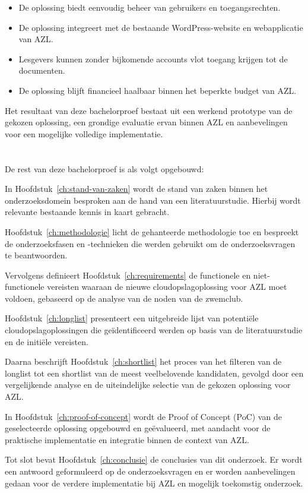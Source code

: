 \begin{itemize}
  \item De oplossing biedt eenvoudig beheer van gebruikers en toegangsrechten.
  \item De oplossing integreert met de bestaande WordPress-website en webapplicatie van AZL.
  \item Lesgevers kunnen zonder bijkomende accounts vlot toegang krijgen tot de documenten.
  \item De oplossing blijft financieel haalbaar binnen het beperkte budget van AZL.
\end{itemize}

Het resultaat van deze bachelorproef bestaat uit een werkend prototype van de gekozen oplossing, een grondige evaluatie ervan binnen AZL en aanbevelingen voor een mogelijke volledige implementatie.

\section{}%
\label{sec:opzet-bachelorproef}


De rest van deze bachelorproef is als volgt opgebouwd:

In Hoofdstuk~\ref{ch:stand-van-zaken} wordt de stand van zaken binnen het onderzoeksdomein besproken aan de hand van een literatuurstudie. Hierbij wordt relevante bestaande kennis in kaart gebracht.

Hoofdstuk~\ref{ch:methodologie} licht de gehanteerde methodologie toe en bespreekt de onderzoeksfasen en -technieken die werden gebruikt om de onderzoeksvragen te beantwoorden.

Vervolgens definieert Hoofdstuk~\ref{ch:requirements} de functionele en niet-functionele vereisten waaraan de nieuwe cloudopslagoplossing voor AZL moet voldoen, gebaseerd op de analyse van de noden van de zwemclub.

Hoofdstuk~\ref{ch:longlist} presenteert een uitgebreide lijst van potentiële cloudopslagoplossingen die geïdentificeerd werden op basis van de literatuurstudie en de initiële vereisten.

Daarna beschrijft Hoofdstuk~\ref{ch:shortlist} het proces van het filteren van de longlist tot een shortlist van de meest veelbelovende kandidaten, gevolgd door een vergelijkende analyse en de uiteindelijke selectie van de gekozen oplossing voor AZL.

In Hoofdstuk~\ref{ch:proof-of-concept} wordt de Proof of Concept (PoC) van de geselecteerde oplossing opgebouwd en geëvalueerd, met aandacht voor de praktische implementatie en integratie binnen de context van AZL.

Tot slot bevat Hoofdstuk~\ref{ch:conclusie} de conclusies van dit onderzoek. Er wordt een antwoord geformuleerd op de onderzoeksvragen en er worden aanbevelingen gedaan voor de verdere implementatie bij AZL en mogelijk toekomstig onderzoek.